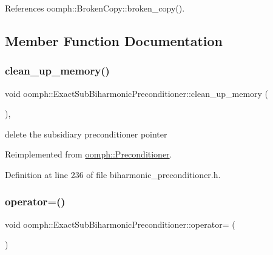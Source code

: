 References oomph\+::\+Broken\+Copy\+::broken\+\_\+copy().



\subsection{Member Function Documentation}
\mbox{\label{classoomph_1_1ExactSubBiharmonicPreconditioner_a846adc01b62a36c06686b50c16f37ac6}} 
\subsubsection{\texorpdfstring{clean\+\_\+up\+\_\+memory()}{clean\_up\_memory()}}
{\footnotesize\ttfamily void oomph\+::\+Exact\+Sub\+Biharmonic\+Preconditioner\+::clean\+\_\+up\+\_\+memory (\begin{DoxyParamCaption}{ }\end{DoxyParamCaption})\hspace{0.3cm}{\ttfamily [inline]}, {\ttfamily [virtual]}}



delete the subsidiary preconditioner pointer 



Reimplemented from \hyperlink{classoomph_1_1Preconditioner_a46c31c416829bedcd9db238431262027}{oomph\+::\+Preconditioner}.



Definition at line 236 of file biharmonic\+\_\+preconditioner.\+h.

\mbox{\label{classoomph_1_1ExactSubBiharmonicPreconditioner_a0ef8a2355dbe216c986392e942dc64dd}} 
\subsubsection{\texorpdfstring{operator=()}{operator=()}}
{\footnotesize\ttfamily void oomph\+::\+Exact\+Sub\+Biharmonic\+Preconditioner\+::operator= (\begin{DoxyParamCaption}\item[{const \hyperlink{classoomph_1_1ExactSubBiharmonicPreconditioner}{Exact\+Sub\+Biharmonic\+Preconditioner} \&}]{ }\end{DoxyParamCaption})\hspace{0.3cm}{\ttfamily [inline]}}



